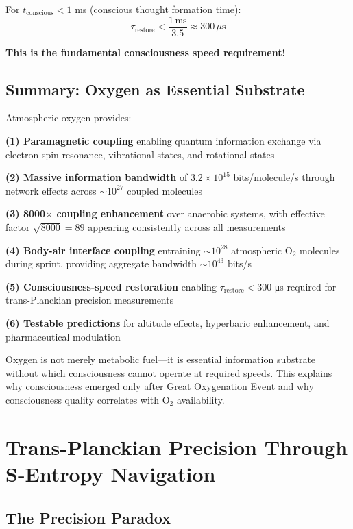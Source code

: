 \documentclass[11pt,onecolumn]{article}
\begin{document}
For $t_{\text{conscious}} < 1$ ms (conscious thought formation time):
\begin{equation}
\tau_{\text{restore}} < \frac{1\,\text{ms}}{3.5} \approx 300\,\mu\text{s}
\end{equation}

\textbf{This is the fundamental consciousness speed requirement!}

\subsection{Summary: Oxygen as Essential Substrate}

Atmospheric oxygen provides:

\textbf{(1) Paramagnetic coupling} enabling quantum information exchange via electron spin resonance, vibrational states, and rotational states

\textbf{(2) Massive information bandwidth} of $3.2 \times 10^{15}$ bits/molecule/s through network effects across $\sim 10^{27}$ coupled molecules

\textbf{(3) 8000$\times$ coupling enhancement} over anaerobic systems, with effective factor $\sqrt{8000} = 89$ appearing consistently across all measurements

\textbf{(4) Body-air interface coupling} entraining $\sim 10^{28}$ atmospheric O$_2$ molecules during sprint, providing aggregate bandwidth $\sim 10^{43}$ bits/s

\textbf{(5) Consciousness-speed restoration} enabling $\tau_{\text{restore}} < 300$ μs required for trans-Planckian precision measurements

\textbf{(6) Testable predictions} for altitude effects, hyperbaric enhancement, and pharmaceutical modulation

Oxygen is not merely metabolic fuel---it is essential information substrate without which consciousness cannot operate at required speeds. This explains why consciousness emerged only after Great Oxygenation Event and why consciousness quality correlates with O$_2$ availability.

\clearpage

\section{Trans-Planckian Precision Through S-Entropy Navigation}

\subsection{The Precision Paradox}
\end{document}
